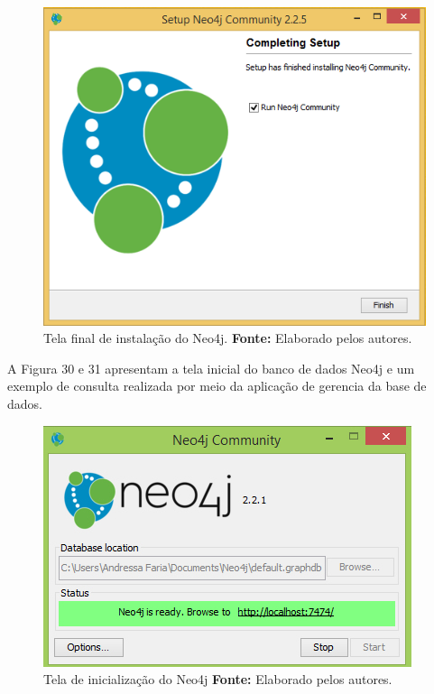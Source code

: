 \begin{figure}[h!]
	\centerline{\includegraphics[scale=0.4]{./imagens/neo4j-install-step5.png}}
	\caption[Tela final de instalação do Neo4j]
	{Tela final de instalação do Neo4j. \textbf{Fonte:} Elaborado pelos autores.}
	\label{fig:exemplo1}
	
\end{figure}

\par A Figura 30 e 31 apresentam a tela inicial do banco de dados Neo4j e um exemplo de consulta realizada por meio da aplicação de gerencia da base de dados.

\begin{figure}[h!]
	\centerline{\includegraphics[scale=0.60]{./imagens/neo4j.jpg}}
	\caption[Tela de inicialização do Neo4j ]
	{Tela de inicialização do Neo4j \textbf{Fonte:} Elaborado pelos autores.}
	\label{fig:exemplo1}
\end{figure}


